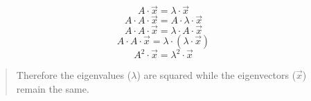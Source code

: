 \documentclass[11pt]{article}
\newenvironment{problem}[2][Problem]{\begin{trivlist}
\item[\hskip \labelsep {\bfseries #1}\hskip \labelsep {\bfseries #2.}]}{\end{trivlist}}
\begin{document}
\begin{problem}{9}
\begin{enumerate}
		\begin{equation}A \cdot \vec{x} = \lambda \cdot \vec{x} \end{equation}
		\begin{equation}A \cdot A \cdot \vec{x} = A \cdot \lambda \cdot \vec{x} \end{equation}
		\begin{equation}A \cdot A \cdot \vec{x} = \lambda \cdot A \cdot \vec{x} \end{equation}
		\begin{equation}A \cdot A \cdot \vec{x} = \lambda \cdot \left( \lambda \cdot \vec{x}\right) \end{equation}
		\begin{equation}A^2 \cdot \vec{x} = \lambda^2 \cdot \vec{x} \end{equation}
		\begin{verse}
			Therefore the eigenvalues ($\lambda$) are squared while the eigenvectors ($\vec{x}$) remain the same.
		\end{verse}
	\end{enumerate}
\end{problem}
\end{document}
